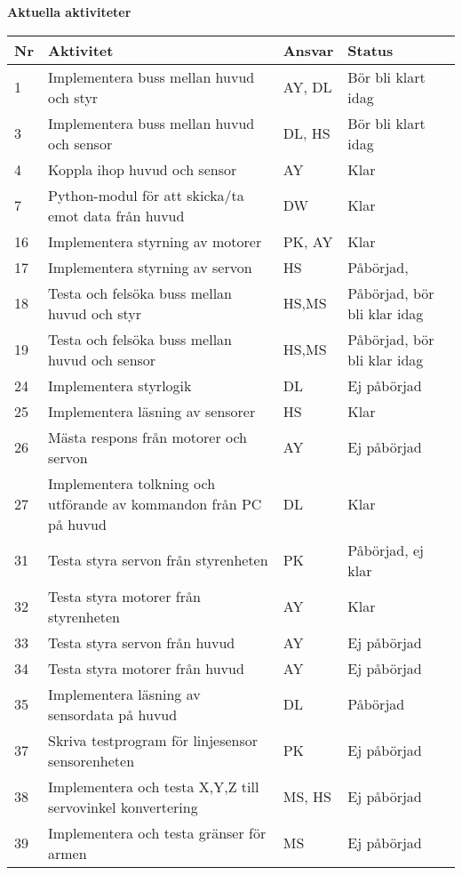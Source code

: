 \documentclass[titlepage, a4paper]{article}
\begin{document}
\newpage
\textbf{\Large Aktuella aktiviteter}
\begin{center}
\begin{tabularx}{\textwidth}{| p{4mm} | X | p{13.5mm} | X |}
	\hline
	\textbf{Nr} & \textbf{Aktivitet} & \textbf{Ansvar} & \textbf{Status} \\\hline	
	{1} & {Implementera buss mellan huvud och styr} & {AY, DL} & {Bör bli klart idag} \\\hline
	{3} & {Implementera buss mellan huvud och sensor} & {DL, HS} & {Bör bli klart idag} \\\hline
	{4} & {Koppla ihop huvud och sensor} & {AY} & {Klar} \\\hline
	{7} & {Python-modul för att skicka/ta emot data från huvud} & {DW} & {Klar} \\\hline
	{16} & {Implementera styrning av motorer} & {PK, AY} & {Klar} \\\hline
	{17} & {Implementera styrning av servon} & {HS} & {Påbörjad, } \\\hline
	{18} & {Testa och felsöka buss mellan huvud och styr} & {HS,MS} & {Påbörjad, bör bli klar idag} \\\hline
	{19} & {Testa och felsöka buss mellan huvud och sensor} & {HS,MS} & {Påbörjad, bör bli klar idag} \\\hline
	{24} & {Implementera styrlogik} & {DL} & {Ej påbörjad} \\\hline
	{25} & {Implementera läsning av sensorer} & {HS} & {Klar} \\\hline
	{26} & {Mästa respons från motorer och servon} & {AY} & {Ej påbörjad} \\\hline
	{27} & {Implementera tolkning och utförande av kommandon från PC på huvud} & {DL} & {Klar} \\\hline
	{31} & {Testa styra servon från styrenheten} & {PK} & {Påbörjad, ej klar} \\\hline
	{32} & {Testa styra motorer från styrenheten} & {AY} & {Klar} \\\hline
	{33} & {Testa styra servon från huvud} & {AY} & {Ej påbörjad} \\\hline
	{34} & {Testa styra motorer från huvud} & {AY} & {Ej påbörjad} \\\hline
	{35} & {Implementera läsning av sensordata på huvud} & {DL} & {Påbörjad} \\\hline
	{37} & {Skriva testprogram för linjesensor sensorenheten} & {PK} & {Ej påbörjad} \\\hline
	{38} & {Implementera och testa X,Y,Z  till servovinkel konvertering} & {MS, HS} & {Ej påbörjad} \\\hline
	{39} & {Implementera och testa gränser för armen} & {MS} & {Ej påbörjad} \\\hline
\end{tabularx}
\end{center}
\end{document}
